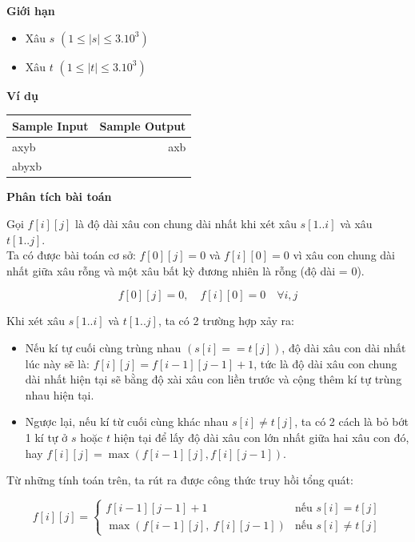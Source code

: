 \documentclass{article}
\begin{document}
\textbf{Giới hạn}
\begin{itemize}
    \item Xâu $s$ $(1 \leq |s| \leq 3.10^3)$
    \item Xâu $t$ $(1 \leq |t| \leq 3.10^3)$
\end{itemize}

\textbf{Ví dụ}

\begin{table}[h]
    \centering
    \begin{tabular}{|l|r|}
        \hline
        \textbf{Sample Input} & \textbf{Sample Output} \\
        \hline
		axyb & axb\\ 
		abyxb &  \\ 
		\hline
    \end{tabular}
\end{table}

\textbf{Phân tích bài toán}

Gọi \(f[i][j]\) là độ dài xâu con chung dài nhất khi xét xâu $s[1..i]$ và xâu $t[1..j]$.\\

Ta có được bài toán cơ sở: \(f[0][j] = 0\) và \(f[i][0] = 0\) vì xâu con chung dài nhất giữa xâu rỗng và một xâu bất kỳ đương nhiên là rỗng (độ dài = 0).

\[
f[0][j] = 0, \quad f[i][0] = 0 \quad \forall i,j
\]

Khi xét xâu $s[1..i]$ và $t[1..j]$, ta có 2 trường hợp xảy ra:
\begin{itemize}
    \item Nếu kí tự cuối cùng trùng nhau $(s[i] == t[j])$, độ dài xâu con dài nhất lúc này sẽ là: $f[i][j] = f[i - 1][j - 1] + 1$, tức là độ dài xâu con chung dài nhất hiện tại sẽ bằng độ xài xâu con liền trước và cộng thêm kí tự trùng nhau hiện tại.
    \item Ngược lại, nếu kí từ cuối cùng khác nhau $s[i] \neq t[j]$, ta có 2 cách là bỏ bớt 1 kí tự ở $s$ hoặc $t$ hiện tại để lấy độ dài xâu con lớn nhất giữa hai xâu con đó, hay $f[i][j] = \max (f[i - 1][j], f[i][j - 1])$.
\end{itemize}

Từ những tính toán trên, ta rút ra được công thức truy hồi tổng quát:

\[
f[i][j] =
\begin{cases}
    f[i - 1][j - 1] + 1 & \text{nếu } s[i] = t[j] \\
    \max(f[i - 1][j],\ f[i][j - 1]) & \text{nếu } s[i] \neq t[j]
\end{cases}
\]
\end{document}
